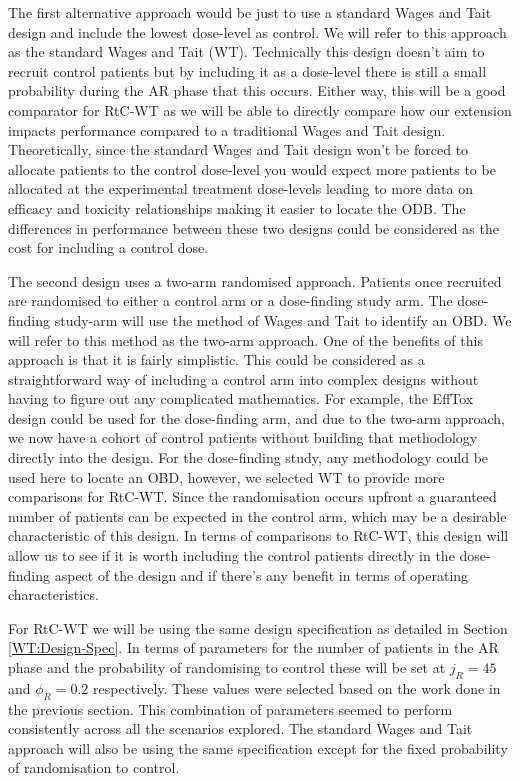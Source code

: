  The first alternative approach would be just to use a standard Wages and Tait design and include the lowest dose-level as control. We will refer to this approach as the standard Wages and Tait (WT). Technically this design doesn't aim to recruit control patients but by including it as a dose-level there is still a small probability during the AR phase that this occurs. Either way, this will be a good comparator for RtC-WT as we will be able to directly compare how our extension impacts performance compared to a traditional Wages and Tait design. Theoretically, since the standard Wages and Tait design won't be forced to allocate patients to the control dose-level you would expect more patients to be allocated at the experimental treatment dose-levels leading to more data on efficacy and toxicity relationships making it easier to locate the ODB. The differences in performance between these two designs could be considered as the cost for including a control dose. 
 
 The second design uses a two-arm randomised approach. Patients once recruited are randomised to either a control arm or a dose-finding study arm. The dose-finding study-arm will use the method of Wages and Tait to identify an OBD. We will refer to this method as the two-arm approach. One of the benefits of this approach is that it is fairly simplistic. This could be considered as a straightforward way of including a control arm into complex designs without having to figure out any complicated mathematics. For example, the EffTox design could be used for the dose-finding arm, and due to the two-arm approach, we now have a cohort of control patients without building that methodology directly into the design. For the dose-finding study, any methodology could be used here to locate an OBD, however, we selected WT to provide more comparisons for RtC-WT. Since the randomisation occurs upfront a guaranteed number of patients can be expected in the control arm, which may be a desirable characteristic of this design. In terms of comparisons to RtC-WT, this design will allow us to see if it is worth including the control patients directly in the dose-finding aspect of the design and if there's any benefit in terms of operating characteristics.  
 
 For RtC-WT we will be using the same design specification as detailed in Section \ref{WT:Design-Spec}. In terms of parameters for the number of patients in the AR phase and the probability of randomising to control these will be set at $j_R = 45 $ and $\phi_R = 0.2 $ respectively. These values were selected based on the work done in the previous section. This combination of parameters seemed to perform consistently across all the scenarios explored. The standard Wages and Tait approach will also be using the same specification except for the fixed probability of randomisation to control.
 
